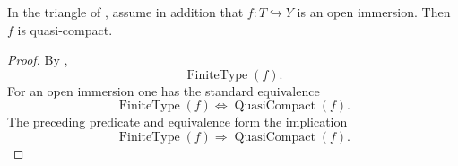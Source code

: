 \begin{corollary}
  \label{lemma:nagata-open-immersion-qc-over-separated-target}
  \lean{}

  In the triangle of
  , assume in addition
  that $f\colon T\hookrightarrow Y$ is an open immersion.  Then $f$ is
  quasi-compact.
\end{corollary}

\begin{proof}
  By ,
  \[
    \operatorname{FiniteType}(f).
  \]
  For an open immersion one has the standard equivalence
  \[
    \operatorname{FiniteType}(f)
      \Longleftrightarrow\operatorname{QuasiCompact}(f).
  \]
  The preceding predicate and equivalence form the implication
  \[
    \operatorname{FiniteType}(f)
      \Longrightarrow\operatorname{QuasiCompact}(f).
  \]
\end{proof}

